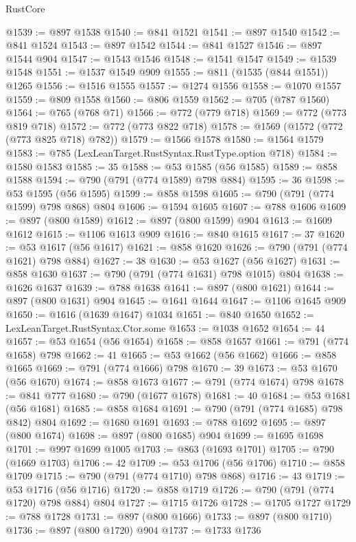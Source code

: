 \begin{lexlean}{RustCore}
\begin{coremodule}
@1539 := @897 @1538
@1540 := @841 @1521
@1541 := @897 @1540
@1542 := @841 @1524
@1543 := @897 @1542
@1544 := @841 @1527
@1546 := @897 @1544 @904
@1547 := @1543 @1546
@1548 := @1541 @1547
@1549 := @1539 @1548
@1551 := @1537 @1549 @909
@1555 := @811 (@1535 (@844 @1551)) @1265
@1556 := @1516 @1555
@1557 := @1274 @1556
@1558 := @1070 @1557
@1559 := @809 @1558
@1560 := @806 @1559
@1562 := @705 (@787 @1560)
@1564 := @765 (@768 @71)
@1566 := @772 (@779 @718)
@1569 := @772 (@773 @819 @718)
@1572 := @772 (@773 @822 @718)
@1578 := @1569 (@1572 (@772 (@773 @825 @718) @782))
@1579 := @1566 @1578
@1580 := @1564 @1579
@1583 := @785 (LexLeanTarget.RustSyntax.RustType.option @718)
@1584 := @1580 @1583
@1585 := 35
@1588 := @53 @1585 (@56 @1585)
@1589 := @858 @1588
@1594 := @790 (@791 (@774 @1589) @798 @884)
@1595 := 36
@1598 := @53 @1595 (@56 @1595)
@1599 := @858 @1598
@1605 := @790 (@791 (@774 @1599) @798 @868) @804
@1606 := @1594 @1605
@1607 := @788 @1606
@1609 := @897 (@800 @1589)
@1612 := @897 (@800 @1599) @904
@1613 := @1609 @1612
@1615 := @1106 @1613 @909
@1616 := @840 @1615
@1617 := 37
@1620 := @53 @1617 (@56 @1617)
@1621 := @858 @1620
@1626 := @790 (@791 (@774 @1621) @798 @884)
@1627 := 38
@1630 := @53 @1627 (@56 @1627)
@1631 := @858 @1630
@1637 := @790 (@791 (@774 @1631) @798 @1015) @804
@1638 := @1626 @1637
@1639 := @788 @1638
@1641 := @897 (@800 @1621)
@1644 := @897 (@800 @1631) @904
@1645 := @1641 @1644
@1647 := @1106 @1645 @909
@1650 := @1616 (@1639 @1647) @1034
@1651 := @840 @1650
@1652 := LexLeanTarget.RustSyntax.Ctor.some
@1653 := @1038 @1652
@1654 := 44
@1657 := @53 @1654 (@56 @1654)
@1658 := @858 @1657
@1661 := @791 (@774 @1658) @798
@1662 := 41
@1665 := @53 @1662 (@56 @1662)
@1666 := @858 @1665
@1669 := @791 (@774 @1666) @798
@1670 := 39
@1673 := @53 @1670 (@56 @1670)
@1674 := @858 @1673
@1677 := @791 (@774 @1674) @798
@1678 := @841 @777
@1680 := @790 (@1677 @1678)
@1681 := 40
@1684 := @53 @1681 (@56 @1681)
@1685 := @858 @1684
@1691 := @790 (@791 (@774 @1685) @798 @842) @804
@1692 := @1680 @1691
@1693 := @788 @1692
@1695 := @897 (@800 @1674)
@1698 := @897 (@800 @1685) @904
@1699 := @1695 @1698
@1701 := @997 @1699 @1005
@1703 := @863 (@1693 @1701)
@1705 := @790 (@1669 @1703)
@1706 := 42
@1709 := @53 @1706 (@56 @1706)
@1710 := @858 @1709
@1715 := @790 (@791 (@774 @1710) @798 @868)
@1716 := 43
@1719 := @53 @1716 (@56 @1716)
@1720 := @858 @1719
@1726 := @790 (@791 (@774 @1720) @798 @884) @804
@1727 := @1715 @1726
@1728 := @1705 @1727
@1729 := @788 @1728
@1731 := @897 (@800 @1666)
@1733 := @897 (@800 @1710)
@1736 := @897 (@800 @1720) @904
@1737 := @1733 @1736

\end{coremodule}
\end{lexlean}
